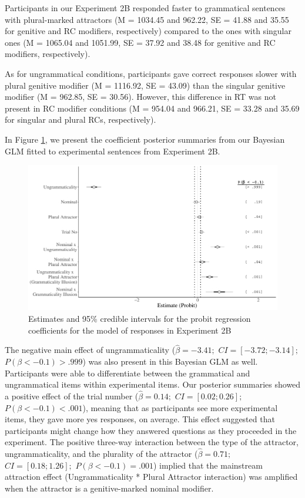 Participants in our Experiment 2B responded faster to grammatical sentences with plural-marked attractors (M = 1034.45 and 962.22, SE = 41.88 and 35.55 for genitive and RC modifiers, respectively) compared to the ones with singular ones (M = 1065.04 and 1051.99, SE = 37.92 and 38.48 for genitive and RC modifiers, respectively). 

As for ungrammatical conditions, participants gave correct responses slower with plural genitive modifier (M = 1116.92, SE = 43.09) than the singular genitive modifier (M = 962.85, SE = 30.56). However, this difference in RT was not present in RC modifier conditions (M = 954.04 and 966.21, SE = 33.28 and 35.69 for singular and plural RCs, respectively). 


In Figure \ref{fig:exp2bBayes}, we present the coefficient posterior summaries from our Bayesian GLM fitted to experimental sentences from Experiment 2B. 


\begin{figure}[hbt!]

{\centering \includegraphics[width=\linewidth]{figure/exp2bBayes-1} 

}

\caption[Estimates and 95\% credible intervals for the probit regression coefficients for the model of responses in Experiment 2B]{Estimates and 95\% credible intervals for the probit regression coefficients for the model of responses in Experiment 2B}\label{fig:exp2bBayes}
\end{figure}

The negative main effect of ungrammaticality ($\hat{\beta}=-3.41;$ $CI=[-3.72; -3.14];$ $P(\beta< -0.1)> .999$) was also present in this Bayesian GLM as well. Participants were able to differentiate between the grammatical and ungrammatical items within experimental items. Our posterior summaries showed a positive effect of the trial number ($\hat{\beta}=0.14;$ $CI=[0.02; 0.26];$ $P(\beta< -0.1)< .001$), meaning that as participants see more experimental items, they gave more yes responses, on average. This effect suggested that participants might change how they answered questions as they proceeded in the experiment. The positive three-way interaction between the type of the attractor, ungrammaticality, and the plurality of the attractor ($\hat{\beta}=0.71;$ $CI=[0.18; 1.26];$ $P(\beta< -0.1)=   .001$) implied that the mainstream attraction effect (Ungrammaticality * Plural Attractor interaction) was amplified when the attractor is a genitive-marked nominal modifier.


